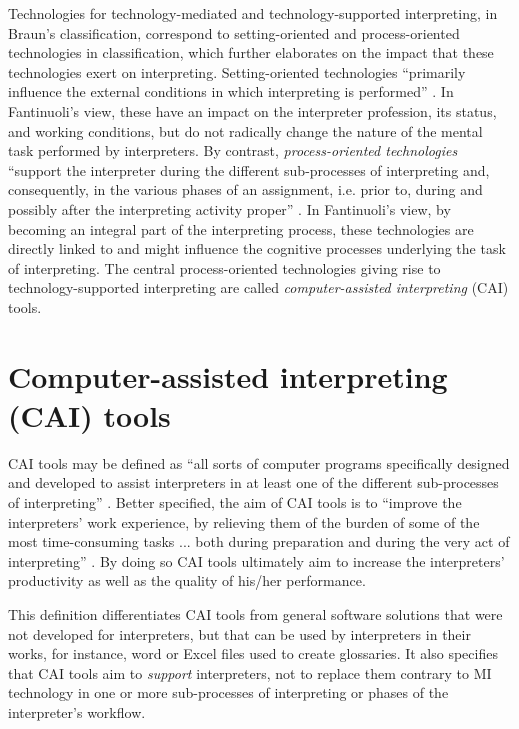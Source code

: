 \begin{sloppypar}
Technologies for technology-mediated and technology-supported interpreting, in Braun’s classification, correspond to setting-oriented and process\hyp{}oriented technologies in  classification, which further elaborates on the impact that these technologies exert on interpreting. Setting\hyp{}oriented technologies ``primarily influence the external conditions in which interpreting is performed'' \citep[155]{fantinuoli2018b}. In Fantinuoli’s view, these have an impact on the interpreter profession, its status, and working conditions, but do not radically change the nature of the mental task performed by interpreters. By contrast,\textit{ process-oriented technologies} ``support the interpreter during the different sub-processes of interpreting and, consequently, in the various phases of an assignment, i.e. prior to, during and possibly after the interpreting activity proper'' \citep[155]{fantinuoli2018b}. In Fantinuoli’s view, by becoming an integral part of the interpreting process, these technologies are directly linked to and might influence the cognitive processes underlying the task of interpreting.  The central process-oriented technologies giving rise to technology-supported interpreting are called \textit{computer-assisted interpreting} (CAI) tools.
\end{sloppypar}

\section{Computer-assisted interpreting (CAI) tools}


CAI tools may be defined as ``all sorts of computer programs specifically designed and developed to assist interpreters in at least one of the different sub-processes of interpreting'' \citep[155]{fantinuoli2018b}. Better specified, the aim of CAI tools is to ``improve the interpreters’ work experience, by relieving them of the burden of some of the most time-consuming tasks ... both during preparation and during the very act of interpreting'' \citep[4]{fantinuoli2018a}. By doing so CAI tools ultimately aim to increase the interpreters’ productivity as well as the quality of his/her performance.

This definition differentiates CAI tools from general software solutions that were not developed for interpreters, but that can be used by interpreters in their works, for instance, word or Excel files used to create glossaries. It also specifies that CAI tools aim to \textit{support} interpreters, not to replace them contrary to MI technology in one or more sub-processes of interpreting or phases of the interpreter’s workflow.

